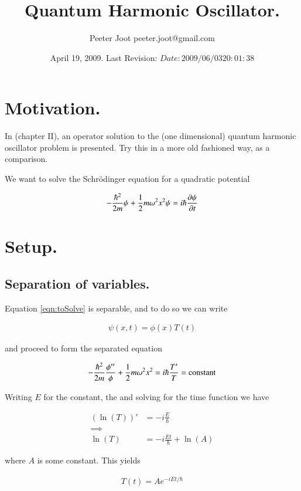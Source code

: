 \documentclass{article}
\title{ Quantum Harmonic Oscillator. }
\author{Peeter Joot \quad peeter.joot@gmail.com }
\date{ April 19, 2009.  Last Revision: $Date: 2009/06/03 20:01:38 $ }
\begin{document}
\maketitle{}
\tableofcontents
\section{Motivation. }

In \cite{byron1992mca} (chapter II), an operator solution to the
(one dimensional) quantum
harmonic oscillator problem is presented.  Try this in a more old fashioned way,
as a comparison.

We want to solve the Schr\"{o}dinger equation for a quadratic potential

\begin{align}\label{eqn:toSolve}
-\frac{\hbar^2}{2m} \psi + \frac{1}{2} m \omega^2 x^2 \psi = i \hbar \frac{\partial {\psi}}{\partial {t}}
\end{align}

\section{Setup. }

\subsection{Separation of variables. }

Equation \ref{eqn:toSolve} is separable, and to do so we can write

\begin{align*}
\psi(x,t) = \phi(x) T(t)
\end{align*}

and proceed to form the separated equation

\begin{align*}
-\frac{\hbar^2}{2m} \frac{\phi''}{\phi} + \frac{1}{2} m \omega^2 x^2 = i \hbar \frac{T'}{T} = \text{constant}
\end{align*}

Writing $E$ for the constant, the and solving for the time function we have

\begin{align*}
(\ln(T))' &= -i \frac{E}{\hbar} \\
\implies \\
\ln(T) &= -i \frac{Et}{\hbar} + \ln(A)
\end{align*}

where $A$ is some constant.  This yields

\begin{align*}
T(t) = A e^{ -i E t/\hbar }
\end{align*}
\end{document}
